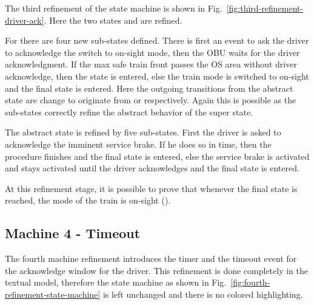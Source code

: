\documentclass{template/openetcs_article}
\begin{document}
The third refinement of the state machine is shown in
Fig.~\ref{fig:third-refinement-driver-ack}. Here the two states
 and  are refined. 

For  there are four new sub-states defined. There is
first an event to ask the driver to acknowledge the switch to on-sight mode,
then the OBU waits for the driver acknowledgment. If the max safe train front
passes the OS area without driver acknowledge, then the
 state is entered, else the train mode is switched to
on-sight and the final state is entered. Here the outgoing transitions from the
abstract  state are change to originate from
 or  respectively. Again this
is possible as the sub-states correctly refine the abstract behavior of the
super state.

The abstract  state is refined by five sub-states. First
the driver is asked to acknowledge the imminent service brake. If he does so in
time, then the procedure finishes and the final state is entered, else the
service brake is activated and stays activated until the driver acknowledges and
the final state is entered.

At this refinement stage, it is possible to prove that whenever the final state
is reached, the mode of the train is on-sight ().

{\footnotesize

}

\subsection{Machine 4 - Timeout}
\label{sec:machine-4-timeout}

The fourth machine refinement introduces the timer and the timeout event for the
acknowledge window for the driver. This refinement is done completely in the
textual model, therefore the state machine as shown in
Fig.~\ref{fig:fourth-refinement-state-machine} is left unchanged and there is no
colored highlighting.
\end{document}
